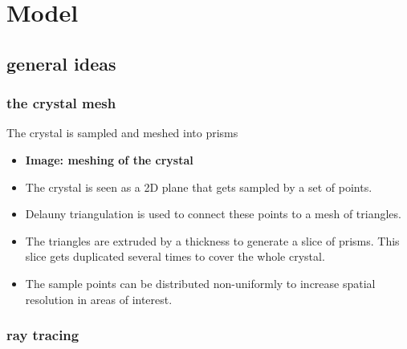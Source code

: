 \section{Model}

\subsection{general ideas}

\subsubsection{the crystal mesh}

The crystal is sampled and meshed into prisms

\begin{itemize}

  \item \textbf{Image: meshing of the crystal}

  \item The crystal is seen as a 2D plane that gets sampled by a set of
    points.\label{label:meshSampling}

  \item Delauny triangulation is used to connect these points to a mesh of
    triangles.

  \item The triangles are extruded by a thickness to generate a slice of
    prisms. This slice gets duplicated several times to cover the whole
    crystal.

  \item The sample points can be distributed non-uniformly to increase
    spatial resolution in areas of interest.

\end{itemize}



\subsubsection{ray tracing}


